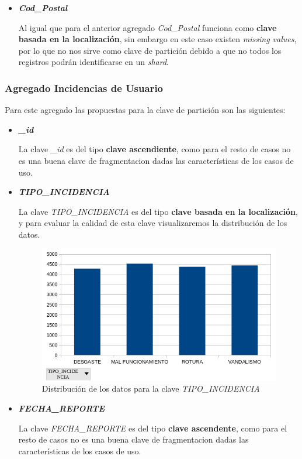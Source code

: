 \documentclass[]{article}
\begin{document}
\begin{itemize}
    \item \textbf{\textit{Cod\_Postal}}
    
    Al igual que para el anterior agregado \textit{Cod\_Postal} funciona como \textbf{clave basada en la localización}, sin embargo en este caso existen \textit{missing values}, por lo que no nos sirve como clave de partición debido a que no todos los registros podrán identificarse en un \textit{shard}.
\end{itemize}

\subsubsection{Agregado Incidencias de Usuario}
\label{subsubsec:fragmentacion_incidencias}

Para este agregado las propuestas para la clave de partición son las siguientes:

\begin{itemize}
    \item \textbf{\textit{\_id}}
    
    La clave \textit{\_id} es del tipo \textbf{clave ascendiente}, como para el resto de casos no es una buena clave de fragmentacion dadas las características de los casos de uso.

    \item \textbf{\textit{TIPO\_INCIDENCIA}}
    
    La clave \textit{TIPO\_INCIDENCIA} es del tipo \textbf{clave basada en la localización}, y para evaluar la calidad de esta clave visualizaremos la distribución de los datos.

    \begin{figure}[H]
        \includegraphics[width=0.90\linewidth]{Distribucion_Incidencias_TIPO_INCIDENCIA.png}
        \caption{Distribución de los datos para la clave \textit{TIPO\_INCIDENCIA}}
    \end{figure}

    \item \textbf{\textit{FECHA\_REPORTE}}
    
    La clave \textit{FECHA\_REPORTE} es del tipo \textbf{clave ascendente}, como para el resto de casos no es una buena clave de fragmentacion dadas las características de los casos de uso.

\end{itemize}
\end{document}
